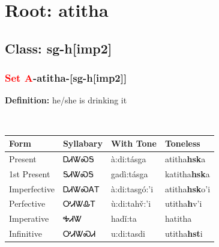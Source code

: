 \needspace{4in}
\section*{Root: atitha}
\nopagebreak
{}
\needspace{3in}
\subsection*{Class: sg-h[imp2]}
\nopagebreak
\needspace{2in}
\subsubsection*{\textcolor{Red}{Set A}{-}\textbf{atitha}{-}[sg-h[imp2]]}
\nopagebreak
\textbf{Definition: } he/she is drinking it
\\[0.5em]
\begin{tabularx}{\textwidth}{l X X X}%
\toprule%
\textbf{Form}&\textbf{Syllabary}&\textbf{With Tone}&\textbf{Toneless}\\%
\midrule%
Present&ᎠᏗᏔᏍᎦ&à:di:tásga&atitha\textbf{hsk}a\\%
1st Present&ᎦᏗᏔᏍᎦ&gadì:tásga&katitha\textbf{hsk}a\\%
Imperfective&ᎠᏗᏔᏍᎪᎢ&à:di:tasgó:’i&atitha\textbf{hsk}o'i\\%
Perfective&ᎤᏗᏔᎲᎢ&ù:di:tahv̌:’i&utitha\textbf{h}v'i\\%
Imperative&ᎭᏗᏔ&hadǐ:ta&hatitha\textbf{}\\%
Infinitive&ᎤᏗᏔᏍᏗ&u:di:tasdi&utitha\textbf{hst}i\\%
\bottomrule%
\end{tabularx}
\\[1em]